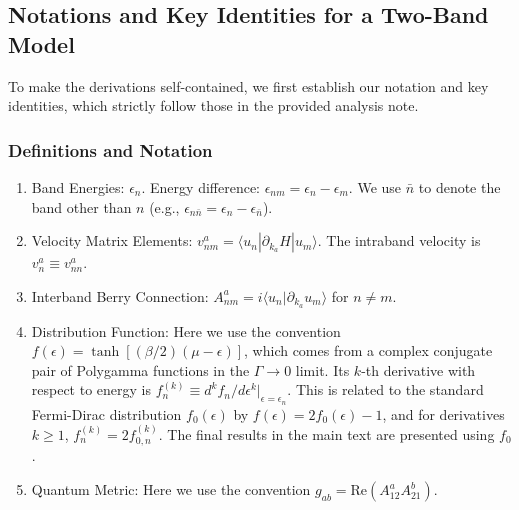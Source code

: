 \documentclass[twocolumn, prx, reprint, amsfonts, amsmath, amssymb, longbibliography, floatfix, aps]{revtex4-2}
\begin{document}
\subsection{Notations and Key Identities for a Two-Band Model}
\label{S-D-1}

To make the derivations self-contained, we first establish our notation and key identities, which strictly follow those in the provided analysis note.

\subsubsection*{Definitions and Notation}
\begin{enumerate}
    \item Band Energies: $\epsilon_n$. Energy difference: $\epsilon_{nm} = \epsilon_n - \epsilon_m$. We use $\bar{n}$ to denote the band other than $n$ (e.g., $\epsilon_{n\bar{n}} = \epsilon_n - \epsilon_{\bar{n}}$).
    \item Velocity Matrix Elements: $v_{nm}^a = \langle u_n | \partial_{k_a} H | u_m \rangle$. The intraband velocity is $v_n^a \equiv v_{nn}^a$.
    \item Interband Berry Connection: $A_{nm}^a = i \langle u_n | \partial_{k_a} u_m \rangle$ for $n \neq m$.
    \item Distribution Function: Here we use the convention $f(\epsilon) = \tanh [(\beta/2)(\mu - \epsilon)]$, which comes from a complex conjugate pair of Polygamma functions in the $\Gamma\to 0$ limit. Its $k$-th derivative with respect to energy is $f_n^{(k)} \equiv d^k f_n/d\epsilon^k |_{\epsilon=\epsilon_n}$. This is related to the standard Fermi-Dirac distribution $f_0 (\epsilon)$ by $f (\epsilon) = 2 f_0 (\epsilon) - 1$, and for derivatives $k \ge 1$, $f_n^{(k)} = 2 f_{0,n}^{(k)}$. The final results in the main text are presented using $f_0$.
    \item Quantum Metric: Here we use the convention $g_{ab} = \text{Re}(A_{12}^a A_{21}^b)$.
\end{enumerate}
\end{document}
